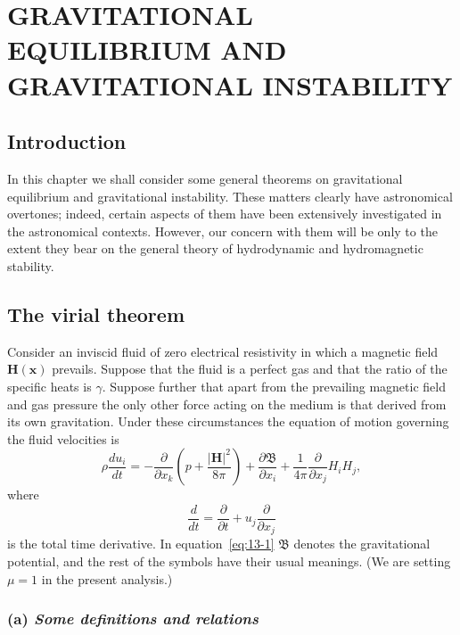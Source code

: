 \chapter{GRAVITATIONAL EQUILIBRIUM AND GRAVITATIONAL INSTABILITY}
\label{ch:13}

\section{Introduction}
\label{sec:116}

In this chapter we shall consider some general theorems on gravitational equilibrium and gravitational instability. These matters clearly have astronomical overtones; indeed, certain aspects of them have been extensively investigated in the astronomical contexts. However, our concern with them will be only to the extent they bear on the general theory of hydrodynamic and hydromagnetic stability.

\section{The virial theorem}
\label{sec:117}

Consider an inviscid fluid of zero electrical resistivity in which a magnetic field $\mathbf{H}(\mathbf{x})$ prevails. Suppose that the fluid is a perfect gas and that the ratio of the specific heats is $\gamma$. Suppose further that apart from the prevailing magnetic field and gas pressure the only other force acting on the medium is that derived from its own gravitation. Under these circumstances the equation of motion governing the fluid velocities is
\begin{equation}
\label{eq:13-1}
\rho \frac{du_i}{dt} = -\frac{\partial}{\partial x_k}\!\left(p + \frac{|\mathbf{H}|^2}{8\pi}\right) + \frac{\partial \mathfrak{B}}{\partial x_i} + \frac{1}{4\pi}\frac{\partial}{\partial x_j}H_i H_j,
\end{equation}
where
\begin{equation}
\label{eq:13-2}
\frac{d}{dt} = \frac{\partial}{\partial t} + u_j \frac{\partial}{\partial x_j}
\end{equation}
is the total time derivative. In equation~\eqref{eq:13-1} $\mathfrak{B}$ denotes the gravitational potential, and the rest of the symbols have their usual meanings. (We are setting $\mu = 1$ in the present analysis.)

\subsection*{(a) \textit{Some definitions and relations}}

